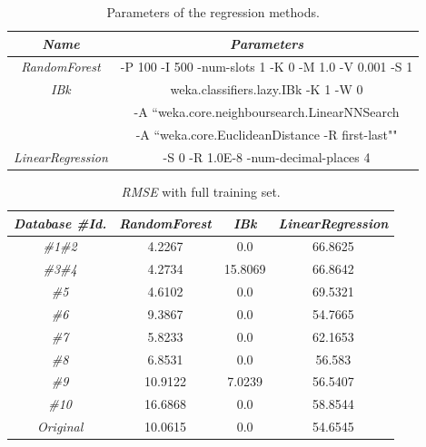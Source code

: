 \documentclass[journal,twoside,web]{ieeecolor}
\begin{document}
\begin{table}[h]
	\begin{center}
			\footnotesize{\begin{tabular}{cc}\hline
			\textit{\textbf{Name}} & \textit{\textbf{Parameters}} \\\hline
			
			\textit{RandomForest} & -P 100 -I 500 -num-slots 1 -K 0 -M 1.0 -V 0.001 -S 1\\
			\textit{IBk} & weka.classifiers.lazy.IBk -K 1 -W 0 \\
			& -A ``weka.core.neighboursearch.LinearNNSearch \\
			& -A ``weka.core.EuclideanDistance -R first-last""\\
			\textit{LinearRegression} & -S 0 -R 1.0E-8 -num-decimal-places 4\\\hline		
		\end{tabular}}
	\end{center}
	\caption{Parameters of the regression methods.}
	\label{PRM}
\end{table}	

\begin{table}[h]
	\begin{center}
			\footnotesize{\begin{tabular}{cccc}\hline
			\textit{\textbf{Database \#Id.}} & \textit{\textbf{RandomForest}} & \textit{\textbf{IBk}} & \textit{\textbf{LinearRegression
					}} \\\hline
			
		\textit{\#1\#2} & 4.2267 & 0.0 & 66.8625 \\	
		\textit{\#3\#4} & 4.2734 & 15.8069 & 66.8642 \\	
		\textit{\#5} & 4.6102 & 0.0 & 69.5321 \\
		\textit{\#6} & 9.3867 & 0.0 &  54.7665\\
		\textit{\#7} & 5.8233 & 0.0 & 62.1653\\
		\textit{\#8} & 6.8531 & 0.0 & 56.583 \\
		\textit{\#9} & 10.9122 & 7.0239 & 56.5407\\
		\textit{\#10} & 16.6868 & 0.0 & 58.8544\\
		\textit{Original} & 10.0615 & 0.0 & 54.6545\\
			\hline		
		\end{tabular}}
	\end{center}
	\caption{\textit{RMSE} with full training set.}
	\label{RFTS}
\end{table}
\end{document}
